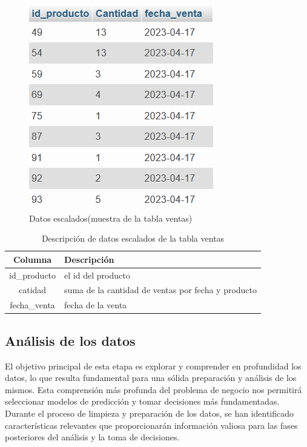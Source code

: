 \begin{figure}[H]
  \begin{center}
    \includegraphics[scale=0.90]{./escalado.png}
    \caption{Datos escalados(muestra de la tabla ventas)}
    \label{fig:escalado}
  \end{center}
\end{figure}

\begin{table}[H]

  \begin{tabular}{|c|l|}  %
    \hline
    \rowcolor{gray!50} \textbf{Columna} & \textbf{Descripción} \\
    \hline
    id\_producto &  el id del producto\\
    catidad & suma de la cantidad de ventas por fecha y producto \\
    fecha\_venta & fecha de la venta \\
    \hline
  \end{tabular}
  \centering
  \caption{ Descripción de datos escalados de la tabla ventas }
  \label{tab:tabla_scalada} %
\end{table}


\subsection{Análisis de los datos }
El objetivo principal de esta etapa es explorar y comprender en profundidad los datos, lo que resulta fundamental para una sólida preparación y análisis de los mismos. Esta comprensión más profunda del problema de negocio nos permitirá seleccionar modelos de predicción y tomar decisiones más fundamentadas. Durante el proceso de limpieza y preparación de los datos, se han identificado características relevantes que proporcionarán información valiosa para las fases posteriores del análisis y la toma de decisiones.

